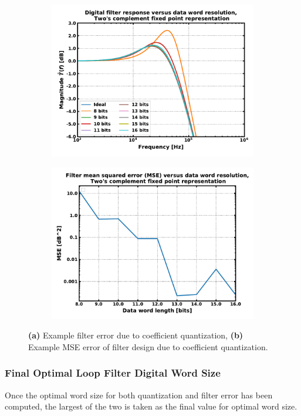 \begin{figure}[htb!]
    \centering
    \begin{subfigure}{0.5\textwidth}
        \centering
        \includegraphics[width=1\textwidth, angle=0]{figs/tf_quant_error.pdf}
        \caption{ }
        \label{fig:tf_curves_quant_error}
    \end{subfigure}%
    \begin{subfigure}{0.5\textwidth}
        \centering
        \includegraphics[width=1\textwidth, angle=0]{figs/tf_mse.pdf}
        \caption{ }
        \label{fig:tf_mse}
    \end{subfigure}
    \label{fig:tf_quant_error}
    \caption{\textbf{(a)} Example filter error due to coefficient quantization, \textbf{(b)} Example MSE error of filter design due to coefficient quantization.}
\end{figure}
\FloatBarrier

\subsubsection{Final Optimal Loop Filter Digital Word Size}
Once the optimal word size for both quantization and filter error has been computed, the largest of the two is taken as the final value for optimal word size. 